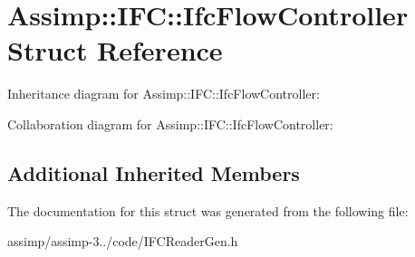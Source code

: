 \hypertarget{struct_assimp_1_1_i_f_c_1_1_ifc_flow_controller}{\section{Assimp\+:\+:I\+F\+C\+:\+:Ifc\+Flow\+Controller Struct Reference}
\label{struct_assimp_1_1_i_f_c_1_1_ifc_flow_controller}
}


Inheritance diagram for Assimp\+:\+:I\+F\+C\+:\+:Ifc\+Flow\+Controller\+:


Collaboration diagram for Assimp\+:\+:I\+F\+C\+:\+:Ifc\+Flow\+Controller\+:
\subsection*{Additional Inherited Members}


The documentation for this struct was generated from the following file\+:\begin{DoxyCompactItemize}
\item 
assimp/assimp-\/3../code/I\+F\+C\+Reader\+Gen.\+h\end{DoxyCompactItemize}
